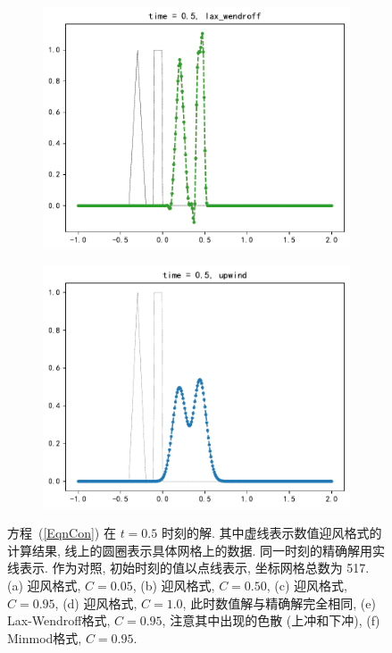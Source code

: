 \documentclass[10.5pt
]{article}
\begin{document}
\begin{figure}
\begin{subfigure}{.48\linewidth}
  \includegraphics[width=\textwidth]{figures/problem1_lax_wendroff0.95.pdf}
  \caption{}
  \label{fig:problem1-5}
\end{subfigure}
\hfill
\begin{subfigure}{.48\linewidth}
  \includegraphics[width=\textwidth]{figures/problem1_upwind0.05.pdf}
  \caption{}
  \label{fig:problem1-6}
\end{subfigure}
\caption{方程~(\ref{EqnCon}) 在 $t=0.5$ 时刻的解. 其中虚线表示数值迎风格式的计算结果, 线上的圆圈表示具体网格上的数据. 同一时刻的精确解用实线表示. 作为对照,
  初始时刻的值以点线表示, 坐标网格总数为 517. (a) 迎风格式, $C = 0.05$, (b)  迎风格式, $C = 0.50$, (c)  迎风格式, $C = 0.95$, (d) 迎风格式, $C = 1.0$,
  此时数值解与精确解完全相同, (e) Lax-Wendroff格式, $C=0.95$, 注意其中出现的色散 (上冲和下冲), (f) Minmod格式, $C=0.95$.} \label{LinearW}
  \label{fig:problem1}%
\end{figure}
\end{document}
